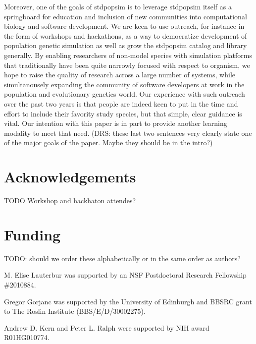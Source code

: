 \documentclass[hidelinks]{article}
\begin{document}
Moreover, one of the goals of stdpopsim is to leverage stdpopsim itself
as a springboard for education and inclusion of new communities into
computational biology and software development. We are keen to use
outreach, for instance in the form of workshops and hackathons, as a way
to democratize development of population genetic simulation as well as
grow the stdpopsim catalog and library generally. By enabling
researchers of non-model species with simulation platforms that
traditionally have been quite narrowly focused with respect to organism,
we hope to raise the quality of research across a large number of
systems, while simultanousely expanding the community of software
developers at work in the population and evolutionary genetics world.
Our experience with such outreach over the past two years is that people
are indeed keen to put in the time and effort to include their favority
study species, but that simple, clear guidance is vital. Our
intention with this paper is in part to provide another learning
modality to meet that need. (DRS: these last two sentences very
clearly state one of the major goals of the paper. Maybe they should be
in the intro?)

\hypertarget{acknowledgements}{%
\section*{Acknowledgements}\label{acknowledgements}}

TODO Workshop and hackhaton attendes?

\hypertarget{funding}{%
\section*{Funding}\label{funding}}

TODO: should we order these alphabetically or in the same order as authors?

M. Elise Lauterbur was supported by an NSF Postdoctoral Research Fellowship \#2010884.

Gregor Gorjanc was supported by the University of Edinburgh and BBSRC grant to The Roslin Institute (BBS/E/D/30002275).

Andrew D. Kern and Peter L. Ralph were supported by NIH award R01HG010774.


\end{document}
